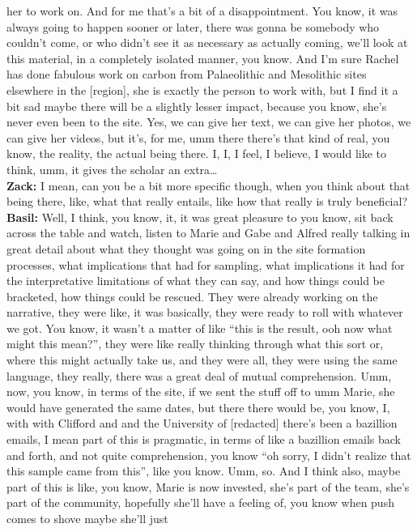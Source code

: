 \documentclass[
  canadian,
]{article}
\begin{document}
her to work on. And for me that's a bit of a disappointment. You know,
it was always going to happen sooner or later, there was gonna be
somebody who couldn't come, or who didn't see it as necessary as
actually coming, we'll look at this material, in a completely isolated
manner, you know. And I'm sure Rachel has done fabulous work on carbon
from Palaeolithic and Mesolithic sites elsewhere in the {[}region{]},
she is exactly the person to work with, but I find it a bit sad maybe
there will be a slightly lesser impact, because you know, she's never
even been to the site. Yes, we can give her text, we can give her
photos, we can give her videos, but it's, for me, umm there there's that
kind of real, you know, the reality, the actual being there. I, I, I
feel, I believe, I would like to think, umm, it gives the scholar an
extra\ldots{}\\
\textbf{Zack:} I mean, can you be a bit more specific though, when you
think about that being there, like, what that really entails, like how
that really is truly beneficial?\\
\textbf{Basil:} Well, I think, you know, it, it was great pleasure to
you know, sit back across the table and watch, listen to Marie and Gabe
and Alfred really talking in great detail about what they thought was
going on in the site formation processes, what implications that had for
sampling, what implications it had for the interpretative limitations of
what they can say, and how things could be bracketed, how things could
be rescued. They were already working on the narrative, they were like,
it was basically, they were ready to roll with whatever we got. You
know, it wasn't a matter of like ``this is the result, ooh now what
might this mean?'', they were like really thinking through what this
sort or, where this might actually take us, and they were all, they were
using the same language, they really, there was a great deal of mutual
comprehension. Umm, now, you know, in terms of the site, if we sent the
stuff off to umm Marie, she would have generated the same dates, but
there there would be, you know, I, with with Clifford and and the
University of {[}redacted{]} there's been a bazillion emails, I mean
part of this is pragmatic, in terms of like a bazillion emails back and
forth, and not quite comprehension, you know ``oh sorry, I didn't
realize that this sample came from this'', like you know. Umm, so. And I
think also, maybe part of this is like, you know, Marie is now invested,
she's part of the team, she's part of the community, hopefully she'll
have a feeling of, you know when push comes to shove maybe she'll just
\end{document}
